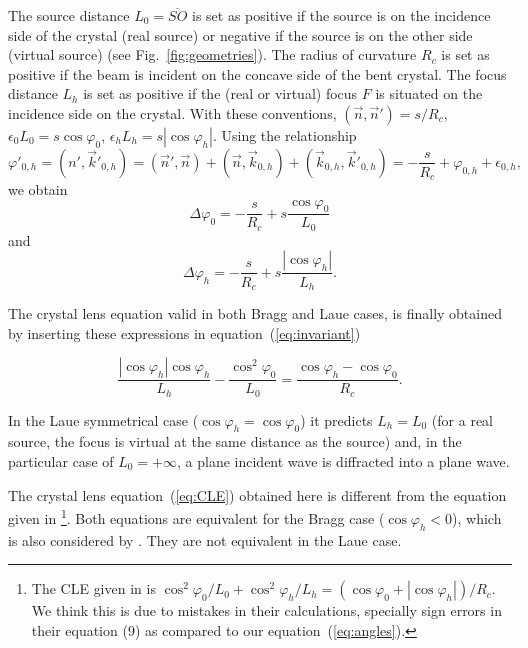 \documentclass[preprint]{iucr}              %
\newcommand{\inred}[1]{{\color{red}#1}}
\begin{document}
The source distance $L_0=\overline{SO}$ is set as positive if the source is on the incidence side of the crystal (real source) or negative if the source is on the other side (virtual source) (see Fig.~\ref{fig:geometries}). The radius of curvature $R_c$ is set as positive if the beam is incident on the concave side of the bent crystal. The focus distance $L_h$ is set as positive if the \inred{(}real or virtual\inred{)} focus \inred{$F$} is situated on the incidence side on the crystal. With these conventions, $(\vec n,\vec n')=s/R_c$, $\epsilon_0 L_0 = s \cos\varphi_0$,  $\epsilon_h L_h = s |\cos\varphi_h|$. Using the relationship
\begin{equation}
    \varphi'_{0,h} = 
    (n',  \vec k'_{0,h}) = 
    (\vec n', \vec n) + (\vec n,\vec k_{0,h}) + (\vec k_{0,h}, \vec k'_{0,h}) = -\frac{s}{R_c} + \varphi_{0,h} + \epsilon_{0,h},
\end{equation}
we obtain
\begin{equation}
\label{eq:angles}
\Delta \varphi_0 =  - \frac{s}{R_c} + s \frac{\cos\varphi_0}{L_0}
\end{equation}
and 
\begin{equation}
\label{eq:angles2}
\Delta \varphi_h = - \frac{s}{R_c} +  s \frac{|\cos\varphi_h|}{L_h}.
\end{equation}

The crystal lens equation \inred{valid in both Bragg and Laue cases,} is finally obtained by inserting these expressions in equation~(\ref{eq:invariant})

\begin{equation}
\label{eq:CLE}
\frac{|\cos\varphi_h| \cos\varphi_h}{L_h} - \frac{\cos^2\varphi_0}{L_0} = \frac{\cos\varphi_h - \cos\varphi_0}{R_c}.
\end{equation}


In the Laue symmetrical case ($\cos\varphi_h=\cos\varphi_0$) it predicts $L_h=L_0$ (for a real source, the focus is virtual at the same distance as the source) and, in the particular case of $L_0=+\infty$, a plane incident wave is diffracted into a plane wave.

The crystal lens equation~(\ref{eq:CLE}) obtained here is different from the equation given in \cite{CK}\footnote{The CLE \inred{given} in \cite{CK} is 
\inred{$
\cos^2\varphi_0/L_0 + \cos^2\varphi_h/L_h = (\cos\varphi_0 + |\cos\varphi_h|)/R_c$}.
We think this is due to mistakes in their calculations, specially sign errors in their equation (9) as compared \inred{to} our equation~(\ref{eq:angles}). 
}.
Both equations are equivalent for the Bragg case ($\cos\varphi_h<0$)\inred{, which is also considered by \citeasnoun{snigirevkohn1995}.} They are not equivalent in the Laue case.
 
\end{document}
